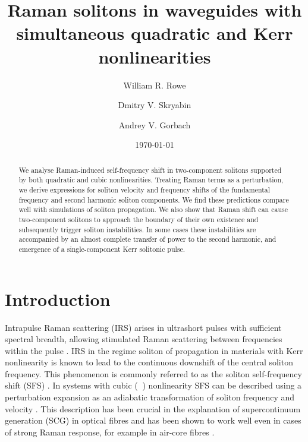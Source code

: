 \documentclass[reprint,
 amsmath,amssymb,
 pra,
]{revtex4-1}
\DeclareMathOperator{\chithree}{ {\chi}^{(3)} }
\begin{document}

\title{Raman solitons in waveguides with simultaneous quadratic and Kerr nonlinearities}

\author{William R. Rowe}
\author{Dmitry V. Skryabin}
\author{Andrey V. Gorbach}%
%

\date{\today}%

\begin{abstract}
We analyse Raman-induced self-frequency shift in two-component solitons supported by both quadratic and cubic nonlinearities. Treating Raman terms as a perturbation, we derive expressions for soliton velocity and frequency shifts of the fundamental frequency and second harmonic soliton components. We find these predictions compare well with simulations of soliton propagation. We also show that Raman shift can cause two-component solitons to approach the boundary of their own existence and subsequently trigger soliton instabilities. In some cases these instabilities are accompanied by an almost complete transfer of power to the second harmonic, and emergence of a single-component Kerr solitonic pulse.
\end{abstract}

\maketitle


\section{Introduction}
Intrapulse Raman scattering (IRS) arises in ultrashort pulses with sufficient spectral breadth, allowing stimulated Raman scattering between frequencies within the pulse \cite{Agrawal2013NonlinearOptics}.  IRS in the regime soliton of propagation in materials with Kerr nonlinearity is known to lead to the continuous downshift of the central soliton frequency. This phenomenon is commonly referred to as the soliton self-frequency shift (SFS) \cite{Agrawal2013NonlinearOptics, Kivshar2003ChapterSolitonsb, Dudley2010SupercontinuumFibers}. In systems with cubic ($\chithree$) nonlinearity SFS can be described using a perturbation expansion as an adiabatic transformation of soliton frequency and velocity \cite{Gordon1986TheoryShift, Kodama1987NonlinearGuide}. This description has been crucial in the explanation of supercontinuum generation (SCG) in optical fibres \cite{Skryabin2003SolitonFibers,Biancalana2004TheoryFibers,Skryabin2010TheoryWaves} and has been shown to work well even in cases of strong Raman response, for example in air-core fibres \cite{Gorbach2008SolitonFibers}.
\end{document}
